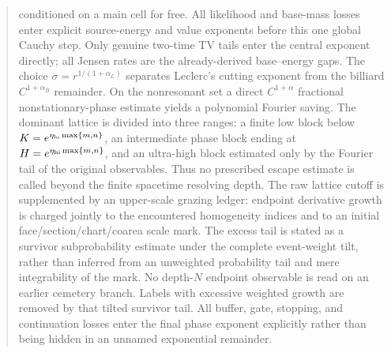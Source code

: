 \documentclass[11pt]{article}
\begin{document}
\begin{abstract}
conditioned on a main cell for free.  All likelihood and base-mass losses
enter explicit source-energy and value exponents before this one global
Cauchy step.  Only genuine
two-time TV tails enter the central exponent directly; all Jensen rates are
the already-derived base--energy gaps.  The
choice $\sigma=r^{1/(1+\alpha_L)}$ separates Leclerc's cutting exponent from
the billiard $C^{1+\alpha_B}$ remainder.  On the nonresonant set a direct
$C^{1+\alpha}$ fractional nonstationary-phase estimate yields a polynomial
Fourier saving.  The dominant lattice is divided into three ranges: a finite
low block below $K=e^{\eta_{\rm lo}\max\{m,n\}}$, an intermediate phase block
ending at $H=e^{\eta_{\rm hi}\max\{m,n\}}$, and an ultra-high block estimated
only by the Fourier tail of the original observables.  Thus no prescribed
escape estimate is called beyond the finite spacetime resolving depth.  The
raw lattice cutoff is supplemented by an upper-scale grazing ledger: endpoint
derivative growth is charged jointly to the encountered homogeneity indices
and to an initial face/section/chart/coarea scale mark.  The excess tail is
stated as a survivor subprobability estimate under the complete event-weight
tilt, rather than inferred from an unweighted probability tail and mere
integrability of the mark.  No depth-$N$ endpoint observable is read on an
earlier cemetery branch.  Labels with excessive weighted growth are removed
by that tilted survivor tail.  All
buffer, gate, stopping, and continuation losses enter the final phase exponent
explicitly rather than being hidden in an unnamed exponential remainder.


\end{abstract}
\end{document}
